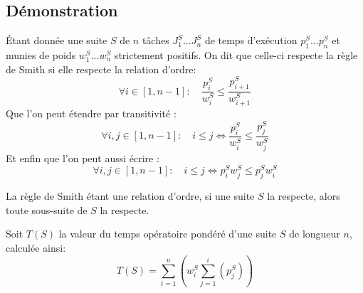 \subsection{Démonstration}
Étant donnée une suite $S$ de $n$ tâches $J^S_1...J^S_n$ de temps d'exécution 
$p^S_1...p^S_n$ et munies de poids $w^S_1...w^S_n$ strictement positifs.  On dit 
que celle-ci respecte la règle de Smith si elle respecte la relation d'ordre:
\begin{equation}
\forall i \in [1,n-1]: \quad \frac{p^S_i}{w^S_i} \leq 
\frac{p^S_{i+1}}{w^S_{i+1}}
\end{equation}
Que l'on peut étendre par transitivité :
\begin{equation}
\forall i,j \in [1,n-1]: \quad i\leq j \Leftrightarrow \frac{p^S_i}{w^S_i} \leq 
\frac{p^S_j}{w^S_j}
\end{equation}
Et enfin que l'on peut aussi écrire :
\begin{equation}\label{inek}
\forall i,j \in [1,n-1]: \quad i\leq j \Leftrightarrow p^S_iw^S_j \leq 
p^S_jw^S_i
\end{equation}

\begin{rmk}
La règle de Smith étant une relation d'ordre, si une suite $S$ la respecte, 
alors toute sous-suite de $S$ la respecte.
\end{rmk}

Soit $T(S)$ la valeur du temps opératoire pondéré d'une suite $S$ de longueur 
$n$, calculée ainsi:
\begin{equation}
T(S) = \sum_{i=1}^n \left(w^S_i\sum_{j=1}^i\left(p^S_j\right)\right)
\end{equation}

